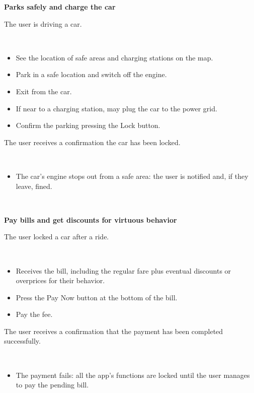 \documentclass[11pt]{article} %
\begin{document}
\begin{description}[noitemsep,topsep=0pt,parsep=0pt,partopsep=0pt]
	\item[Name:] \textbf{Parks safely and charge the car}
	\item[Entry Conditions:] The user is driving a car.
	\item[Flow Of Events:] \hfill\
	\begin{itemize}
		\item See the location of safe areas and charging stations on the map.
		\item Park in a safe location and switch off the engine.
		\item Exit from the car.
		\item If near to a charging station, may plug the car to the power grid.
		\item Confirm the parking pressing the Lock button.
	\end{itemize}
	\item[Exit conditions:]  The user receives a confirmation the car has been locked.
	\item[Exceptions:] \hfill\
	\begin{itemize}
		\item The car's engine stops out from a safe area: the user is notified and, if they leave, fined.
	\end{itemize}
\end{description}
\hfill\

\begin{description}[noitemsep,topsep=0pt,parsep=0pt,partopsep=0pt]
	\item[Name:] \textbf{Pay bills and get discounts for virtuous behavior}
	\item[Entry Conditions:] The user locked a car after a ride.
	\item[Flow Of Events:] \hfill\
	\begin{itemize}
		\item Receives the bill, including the regular fare plus eventual discounts or overprices for their behavior.
		\item Press the Pay Now button at the bottom of the bill.
		\item Pay the fee.
	\end{itemize}
	\item[Exit conditions:]  The user receives a confirmation that the payment has been completed successfully.
	\item[Exceptions:] \hfill\
	\begin{itemize}
		\item The payment fails: all the app's functions are locked until the user manages to pay the pending bill.
	\end{itemize}
\end{description}
\hfill\
\end{document}
